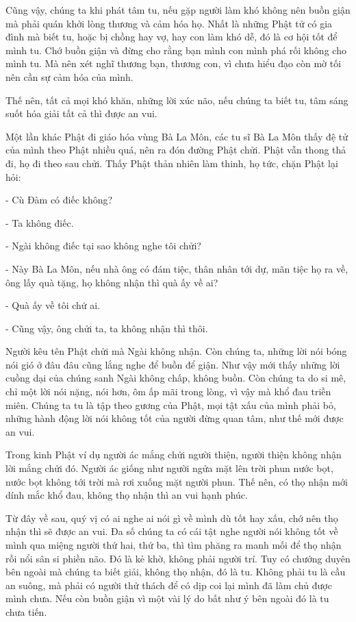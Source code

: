 \documentclass[
  12pt,
  oneside]{book}
\begin{document}
Cũng vậy, chúng ta khi phát tâm tu, nếu gặp người làm khó không nên buồn giận mà phải quán khởi lòng thương và cảm hóa họ. Nhất là những Phật tử có gia đình mà biết tu, hoặc bị chồng hay vợ, hay con làm khó dễ, đó là cơ hội tốt để mình tu. Chớ buồn giận và đừng cho rằng bạn mình con mình phá rối không cho mình tu. Mà nên xét nghĩ thương bạn, thương con, vì chưa hiểu đạo còn mờ tối nên cần sự cảm hóa của mình.

Thế nên, tất cả mọi khó khăn, những lời xúc não, nếu chúng ta biết tu, tâm sáng suốt hóa giải tất cả thì được an vui.

Một lần khác Phật đi giáo hóa vùng Bà La Môn, các tu sĩ Bà La Môn thấy đệ tử của mình theo Phật nhiều quá, nên ra đón đường Phật chửi. Phật vẫn thong thả đi, họ đi theo sau chửi. Thấy Phật thản nhiên làm thinh, họ tức, chặn Phật lại hỏi:

- Cù Đàm có điếc không?

- Ta không điếc.

- Ngài không điếc tại sao không nghe tôi chửi?

- Này Bà La Môn, nếu nhà ông có đám tiệc, thân nhân tới dự, mãn tiệc họ ra về, ông lấy quà tặng, họ không nhận thì quà ấy về ai?

- Quà ấy về tôi chứ ai.

- Cũng vậy, ông chửi ta, ta không nhận thì thôi.

Người kêu tên Phật chửi mà Ngài không nhận. Còn chúng ta, những lời nói bóng nói gió ở đâu đâu cũng lắng nghe để buồn để giận. Như vậy mới thấy những lời cuồng dại của chúng sanh Ngài không chấp, không buồn. Còn chúng ta do si mê, chỉ một lời nói nặng, nói hơn, ôm ấp mãi trong lòng, vì vậy mà khổ đau triền miên. Chúng ta tu là tập theo gương của Phật, mọi tật xấu của mình phải bỏ, những hành động lời nói không tốt của người đừng quan tâm, như thế mới được an vui.

Trong kinh Phật ví dụ người ác mắng chửi người thiện, người thiện không nhận lời mắng chửi đó. Người ác giống như người ngửa mặt lên trời phun nước bọt, nước bọt không tới trời mà rơi xuống mặt người phun. Thế nên, có thọ nhận mới dính mắc khổ đau, không thọ nhận thì an vui hạnh phúc.

Từ đây về sau, quý vị có ai nghe ai nói gì về mình dù tốt hay xấu, chớ nên thọ nhận thì sẽ được an vui. Đa số chúng ta có cái tật nghe người nói không tốt về mình qua miệng người thứ hai, thứ ba, thì tìm phăng ra manh mối để thọ nhận rồi nổi sân si phiền não. Đó là kẻ khờ, không phải người trí. Tuy có chướng duyên bên ngoài mà chúng ta biết giải, không thọ nhận, đó là tu. Không phải tu là cầu an suông, mà phải có người thử thách để có dịp coi lại mình đã làm chủ được mình chưa. Nếu còn buồn giận vì một vài lý do bất như ý bên ngoài đó là tu chưa tiến.
\end{document}
